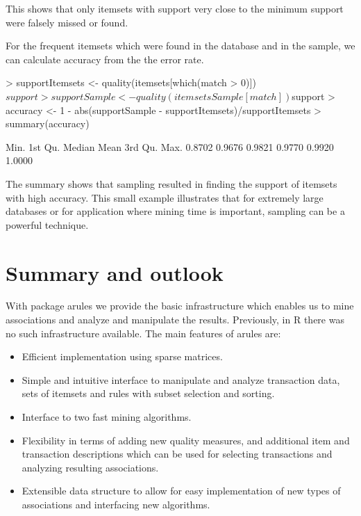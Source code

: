 \documentclass[10pt,a4paper]{article}
\newcommand{\strong}[1]{{\normalfont\fontseries{b}\selectfont #1}}
\newcommand{\pkg}[1]{\strong{#1}}
\newcommand{\proglang}[1]{\textsf{#1}}
\begin{document}
This shows that only itemsets with support very close to the minimum support
were falsely missed or found.

For the frequent itemsets which were found in the database and in the
sample, we can calculate accuracy from the the error rate.

\begin{Schunk}
\begin{Sinput}
> supportItemsets <- quality(itemsets[which(match > 0)])$support
> supportSample <- quality(itemsetsSample[match])$support
> accuracy <- 1 - abs(supportSample - supportItemsets)/supportItemsets
> summary(accuracy)
\end{Sinput}
\begin{Soutput}
   Min. 1st Qu.  Median    Mean 3rd Qu.    Max. 
 0.8702  0.9676  0.9821  0.9770  0.9920  1.0000 
\end{Soutput}
\end{Schunk}

The summary shows that sampling resulted in finding the support of itemsets
with high accuracy. This small example illustrates 
that for extremely large databases or for application where mining time 
is important, sampling can be a powerful technique.



\section{Summary and outlook\label{sec:conclusion}}

With package \pkg{arules} we
provide the basic infrastructure which enables us to 
mine associations and analyze and manipulate the results. 
Previously, in \proglang{R} there was no such infrastructure available.
The main features of \pkg{arules} are:

\begin{itemize}
 \item Efficient implementation using sparse matrices.
 \item Simple and intuitive interface to manipulate and analyze
  transaction data, sets of itemsets and rules with subset selection and
  sorting.
 \item Interface to two fast mining algorithms.
 \item Flexibility in terms of adding new quality measures, and
  additional item and transaction descriptions which can be used for
  selecting transactions and analyzing resulting associations.
 \item Extensible data structure to allow for easy implementation of new
  types of associations and interfacing new algorithms.
\end{itemize}
\end{document}

